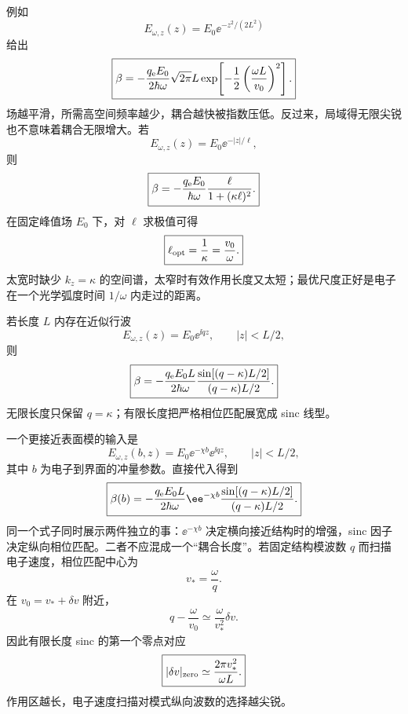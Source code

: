 例如
\begin{equation}
E_{\omega,z}(z)=E_0\ee^{-z^2/(2L^2)}
\end{equation}
给出
\begin{equation}
\boxed{
\beta
=-\frac{q_{\rm e}E_0}{2\hbar\omega}\sqrt{2\pi}L
\exp\!\left[-\frac12\left(\frac{\omega L}{v_0}\right)^2\right].}
\label{eq:beta-gaussian-field}
\end{equation}
场越平滑，所需高空间频率越少，耦合越快被指数压低。反过来，局域得无限尖锐也不意味着耦合无限增大。若
\begin{equation}
E_{\omega,z}(z)=E_0\ee^{-|z|/\ell},
\end{equation}
则
\begin{equation}
\boxed{
\beta
=-\frac{q_{\rm e}E_0}{\hbar\omega}
\frac{\ell}{1+(\kappa\ell)^2}.}
\label{eq:exponential-localization-beta}
\end{equation}
在固定峰值场 \(E_0\) 下，对 \(\ell\) 求极值可得
\begin{equation}
\boxed{\ell_{\rm opt}=\frac{1}{\kappa}=\frac{v_0}{\omega}.}
\label{eq:optimal-longitudinal-localization}
\end{equation}
太宽时缺少 \(k_z=\kappa\) 的空间谱，太窄时有效作用长度又太短；最优尺度正好是电子在一个光学弧度时间 \(1/\omega\) 内走过的距离。

若长度 \(L\) 内存在近似行波
\begin{equation}
E_{\omega,z}(z)=E_0\ee^{\ii qz},
\qquad |z|<L/2,
\end{equation}
则
\begin{equation}
\boxed{
\beta
=-\frac{q_{\rm e}E_0L}{2\hbar\omega}
\frac{\sin[(q-\kappa)L/2]}{(q-\kappa)L/2}.}
\label{eq:finite-length-sinc-matching}
\end{equation}
无限长度只保留 \(q=\kappa\)；有限长度把严格相位匹配展宽成 sinc 线型。

一个更接近表面模的输入是
\begin{equation}
E_{\omega,z}(b,z)=E_0\ee^{-\chi b}\ee^{\ii qz},
\qquad |z|<L/2,
\end{equation}
其中 \(b\) 为电子到界面的冲量参数。直接代入得到
\begin{equation}
\boxed{
\beta(b)
=-\frac{q_{\rm e}E_0L}{2\hbar\omega}
\ee^{-\chi b}
\frac{\sin[(q-\kappa)L/2]}{(q-\kappa)L/2}.}
\label{eq:evanescent-traveling-beta}
\end{equation}
同一个式子同时展示两件独立的事：\(\ee^{-\chi b}\) 决定横向接近结构时的增强，sinc 因子决定纵向相位匹配。二者不应混成一个“耦合长度”。若固定结构模波数 \(q\) 而扫描电子速度，相位匹配中心为
\begin{equation}
\boxed{v_*=\frac{\omega}{q}.}
\label{eq:velocity-phase-match-center}
\end{equation}
在 \(v_0=v_*+\delta v\) 附近，
\begin{equation}
q-\frac{\omega}{v_0}
\simeq\frac{\omega}{v_*^2}\delta v.
\end{equation}
因此有限长度 sinc 的第一个零点对应
\begin{equation}
\boxed{
|\delta v|_{\rm zero}
\simeq\frac{2\pi v_*^2}{\omega L}.}
\label{eq:velocity-phase-match-width}
\end{equation}
作用区越长，电子速度扫描对模式纵向波数的选择越尖锐。


